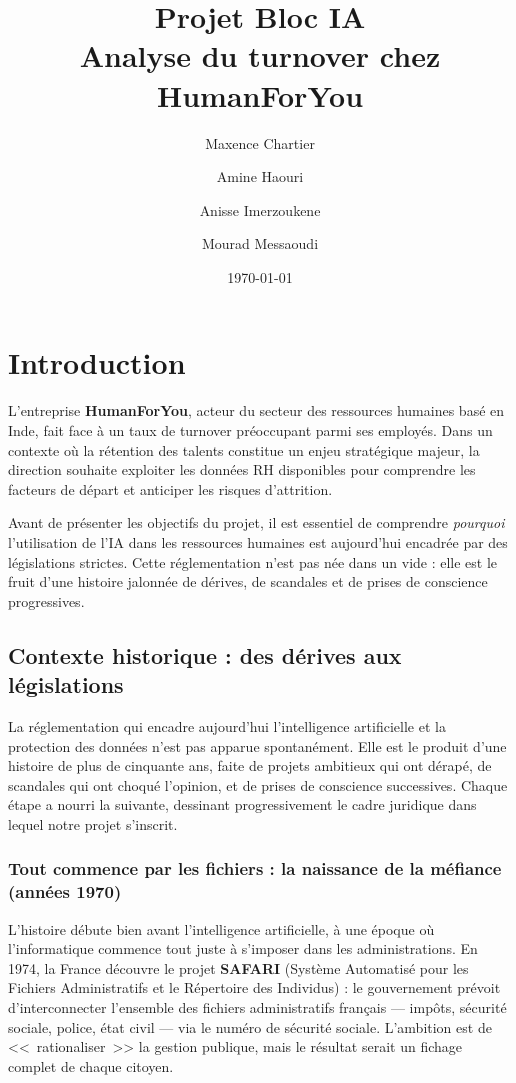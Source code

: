 \documentclass[12pt,a4paper]{article}
\title{Projet Bloc IA \\ \Large Analyse du turnover chez HumanForYou}
\author{
    Maxence Chartier \and
    Amine Haouri \and
    Anisse Imerzoukene \and
    Mourad Messaoudi
}
\date{\today}
\begin{document}
\maketitle
\thispagestyle{empty}
\newpage
{\small
\tableofcontents
}
\newpage

\section{Introduction}

L'entreprise \textbf{HumanForYou}, acteur du secteur des ressources humaines basé en Inde, fait face à un taux de turnover préoccupant parmi ses employés. Dans un contexte où la rétention des talents constitue un enjeu stratégique majeur, la direction souhaite exploiter les données RH disponibles pour comprendre les facteurs de départ et anticiper les risques d'attrition.

Avant de présenter les objectifs du projet, il est essentiel de comprendre \textit{pourquoi} l'utilisation de l'IA dans les ressources humaines est aujourd'hui encadrée par des législations strictes. Cette réglementation n'est pas née dans un vide : elle est le fruit d'une histoire jalonnée de dérives, de scandales et de prises de conscience progressives.

\subsection{Contexte historique : des dérives aux législations}

La réglementation qui encadre aujourd'hui l'intelligence artificielle et la protection des données n'est pas apparue spontanément. Elle est le produit d'une histoire de plus de cinquante ans, faite de projets ambitieux qui ont dérapé, de scandales qui ont choqué l'opinion, et de prises de conscience successives. Chaque étape a nourri la suivante, dessinant progressivement le cadre juridique dans lequel notre projet s'inscrit.

\subsubsection{Tout commence par les fichiers : la naissance de la méfiance (années 1970)}

L'histoire débute bien avant l'intelligence artificielle, à une époque où l'informatique commence tout juste à s'imposer dans les administrations. En 1974, la France découvre le projet \textbf{SAFARI} (Système Automatisé pour les Fichiers Administratifs et le Répertoire des Individus) : le gouvernement prévoit d'interconnecter l'ensemble des fichiers administratifs français --- impôts, sécurité sociale, police, état civil --- via le numéro de sécurité sociale. L'ambition est de <<~rationaliser~>> la gestion publique, mais le résultat serait un fichage complet de chaque citoyen.
\end{document}
